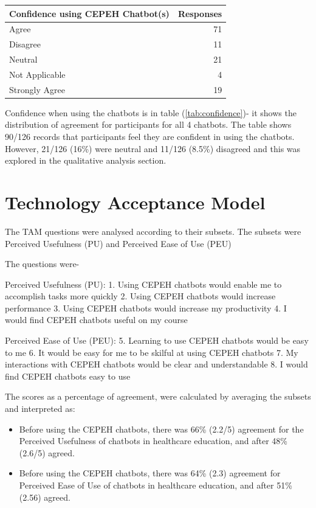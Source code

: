 \documentclass[a4paper, nobind]{templates/ociamthesis}
\begin{document}
\begin{longtable}[]{@{}lr@{}}
\toprule()
Confidence using CEPEH Chatbot(s) & Responses \\
\midrule()
\endhead
Agree & 71 \\
Disagree & 11 \\
Neutral & 21 \\
Not Applicable & 4 \\
Strongly Agree & 19 \\
\bottomrule()
\end{longtable}

Confidence when using the chatbots is in table (\ref{tab:confidence})- it shows the distribution of agreement for participants for all
4 chatbots. The table shows 90/126 records that participants feel they are confident in using the chatbots. However, 21/126 (16\%) were neutral and 11/126 (8.5\%) disagreed and this was explored in the qualitative analysis section.

\hypertarget{technology-acceptance-model}{%
\section{Technology Acceptance Model}\label{technology-acceptance-model}}

The TAM questions were analysed according to their subsets. The subsets
were Perceived Usefulness (PU) and Perceived Ease of Use (PEU)

The questions were-

Perceived Usefulness (PU):
1. Using CEPEH chatbots would enable me to accomplish tasks more
quickly
2. Using CEPEH chatbots would increase performance
3. Using CEPEH chatbots would increase my productivity
4. I would find CEPEH chatbots useful on my course

Perceived Ease of Use (PEU):
5. Learning to use CEPEH chatbots would be easy to me
6. It would be easy for me to be skilful at using CEPEH chatbots
7. My interactions with CEPEH chatbots would be clear and understandable
8. I would find CEPEH chatbots easy to use

The scores as a percentage of agreement, were calculated by averaging the subsets and interpreted as:

\begin{itemize}
\item
  Before using the CEPEH chatbots, there was 66\% (2.2/5) agreement for the Perceived Usefulness of chatbots in healthcare education, and after 48\% (2.6/5) agreed.
\item
  Before using the CEPEH chatbots, there was 64\% (2.3) agreement for Perceived Ease of Use of chatbots in healthcare education, and after 51\% (2.56) agreed.
\end{itemize}
\end{document}
